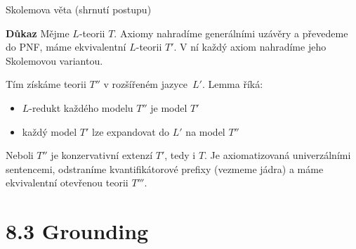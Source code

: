 \documentclass{beamer}
\begin{document}
\begin{frame}{Skolemova věta (shrnutí postupu)}

    \pause

    \pause
    \textbf{Důkaz} Mějme $L$-teorii $T$. Axiomy nahradíme generálními uzávěry a převedeme do PNF, máme ekvivalentní $L$-teorii $T'$. V ní každý axiom nahradíme jeho Skolemovou variantou. 
    
    \pause
    Tím získáme teorii $T''$ v rozšířeném jazyce~$L'$. Lemma říká:
    \begin{itemize}
        \item $L$-redukt každého modelu $T''$ je model $T'$
        \item každý model $T'$ lze expandovat do $L'$ na model $T''$
    \end{itemize}
    \pause
    Neboli $T''$ je konzervativní extenzí $T'$, tedy i $T$. Je axiomatizovaná  univerzálními sentencemi, odstraníme kvantifikátorové prefixy (vezmeme jádra) a máme ekvivalentní otevřenou teorii $T'''$.    
    \hfill\qedsymbol

    \medskip

    \pause

\end{frame}


\section{8.3 Grounding}
\end{document}
